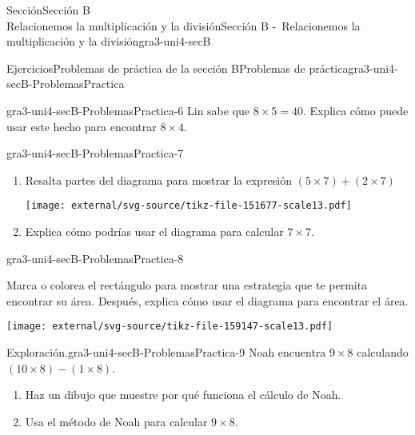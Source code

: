 \begin{sectionptx}{Sección}{{\Large Sección B\\}Relacionemos la multiplicación y la división}{}{Sección B -~Relacionemos la multiplicación y la división}{}{}{gra3-uni4-secB}
\begin{exercises-subsection}{Ejercicios}{Problemas de práctica de la sección B}{}{Problemas de práctica}{}{}{gra3-uni4-secB-ProblemasPractica}
\begin{divisionexercise}{4}{}{}{gra3-uni4-secB-ProblemasPractica-6}
Lin sabe que \(8 \times 5 = 40\). Explica cómo puede usar este hecho para encontrar \(8 \times 4\).%
\end{divisionexercise}%
\begin{divisionexercise}{5}{}{}{gra3-uni4-secB-ProblemasPractica-7}%
%
\vspace*{-3ex}
\begin{enumerate}[label={(\alph*)}]
\item{}Resalta partes del diagrama para mostrar la expresión \((5 \times 7) + (2 \times 7)\)%
\begin{image}{0}{1}{0}{}%
\texttt{[image: external/svg-source/tikz-file-151677-scale13.pdf]}
\end{image}%
\item{}Explica cómo podrías usar el diagrama para calcular \(7\times 7\).%
\end{enumerate}
\end{divisionexercise}%
\begin{divisionexercise}{6}{}{}{gra3-uni4-secB-ProblemasPractica-8}%
\vspace*{-3ex}
\begin{sidebyside}{2}{0}{0}{0}%
\begin{sbspanel}{0.6}%
Marca o colorea el rectángulo para mostrar una estrategia que te permita encontrar su área. Después, explica cómo usar el diagrama para encontrar el área.%
\end{sbspanel}%
\begin{sbspanel}{0.4}%
\texttt{[image: external/svg-source/tikz-file-159147-scale13.pdf]}
\end{sbspanel}%
\end{sidebyside}%
\end{divisionexercise}%
\begin{divisionexercise}{7}{Exploración.}{}{gra3-uni4-secB-ProblemasPractica-9}%
Noah encuentra \(9 \times 8\) calculando \((10 \times 8) - (1 \times 8)\).%
%
\begin{enumerate}[label={(\alph*)}]
\item{}Haz un dibujo que muestre por qué funciona el cálculo de Noah.%
\item{}Usa el método de Noah para calcular \(9\times 8\).%
\end{enumerate}
\end{divisionexercise}%
\end{exercises-subsection}
%
%
\typeout{************************************************}

\end{sectionptx}

